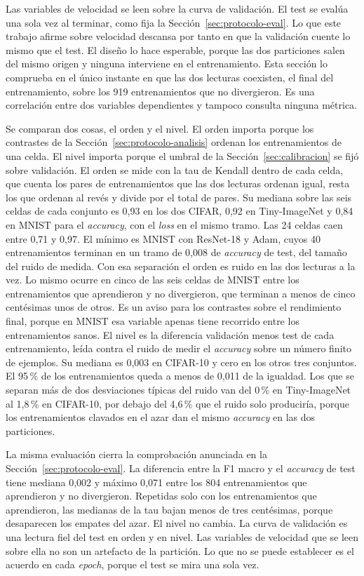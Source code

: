 Las variables de velocidad se leen sobre la curva de validación. El test se evalúa una sola vez al terminar, como fija la Sección~\ref{sec:protocolo-eval}. Lo que este trabajo afirme sobre velocidad descansa por tanto en que la validación cuente lo mismo que el test. El diseño lo hace esperable, porque las dos particiones salen del mismo origen y ninguna interviene en el entrenamiento. Esta sección lo comprueba en el único instante en que las dos lecturas coexisten, el final del entrenamiento, sobre los 919 entrenamientos que no divergieron. Es una correlación entre dos variables dependientes y tampoco consulta ninguna métrica.

Se comparan dos cosas, el orden y el nivel. El orden importa porque los contrastes de la Sección~\ref{sec:protocolo-analisis} ordenan los entrenamientos de una celda. El nivel importa porque el umbral de la Sección~\ref{sec:calibracion} se fijó sobre validación. El orden se mide con la tau de Kendall dentro de cada celda, que cuenta los pares de entrenamientos que las dos lecturas ordenan igual, resta los que ordenan al revés y divide por el total de pares. Su mediana sobre las seis celdas de cada conjunto es 0,93 en los dos CIFAR, 0,92 en Tiny-ImageNet y 0,84 en MNIST para el \emph{accuracy}, con el \emph{loss} en el mismo tramo. Las 24 celdas caen entre 0,71 y 0,97. El mínimo es MNIST con ResNet-18 y Adam, cuyos 40 entrenamientos terminan en un tramo de 0,008 de \emph{accuracy} de test, del tamaño del ruido de medida. Con esa separación el orden es ruido en las dos lecturas a la vez. Lo mismo ocurre en cinco de las seis celdas de MNIST entre los entrenamientos que aprendieron y no divergieron, que terminan a menos de cinco centésimas unos de otros. Es un aviso para los contrastes sobre el rendimiento final, porque en MNIST esa variable apenas tiene recorrido entre los entrenamientos sanos. El nivel es la diferencia validación menos test de cada entrenamiento, leída contra el ruido de medir el \emph{accuracy} sobre un número finito de ejemplos. Su mediana es 0,003 en CIFAR-10 y cero en los otros tres conjuntos. El 95\,\% de los entrenamientos queda a menos de 0,011 de la igualdad. Los que se separan más de dos desviaciones típicas del ruido van del 0\,\% en Tiny-ImageNet al 1,8\,\% en CIFAR-10, por debajo del 4,6\,\% que el ruido solo produciría, porque los entrenamientos clavados en el azar dan el mismo \emph{accuracy} en las dos particiones.

La misma evaluación cierra la comprobación anunciada en la Sección~\ref{sec:protocolo-eval}. La diferencia entre la F1 macro y el \emph{accuracy} de test tiene mediana 0,002 y máximo 0,071 entre los 804 entrenamientos que aprendieron y no divergieron. Repetidas solo con los entrenamientos que aprendieron, las medianas de la tau bajan menos de tres centésimas, porque desaparecen los empates del azar. El nivel no cambia. La curva de validación es una lectura fiel del test en orden y en nivel. Las variables de velocidad que se leen sobre ella no son un artefacto de la partición. Lo que no se puede establecer es el acuerdo en cada \emph{epoch}, porque el test se mira una sola vez.

